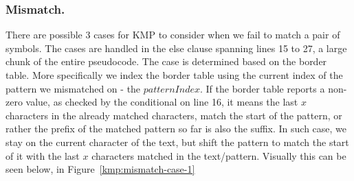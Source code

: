 \subsubsection{Mismatch.}
There are possible 3 cases for KMP to consider when we fail to match a pair of symbols. The cases are handled in the else clause spanning lines 15 to 27, a large chunk of the entire pseudocode. The case is determined based on the border table. More specifically we index the border table using the current index of the pattern we mismatched on - the $patternIndex$. If the border table reports a non-zero value, as checked by the conditional on line 16, it means the last $x$ characters in the already matched characters, match the start of the pattern, or rather the prefix of the matched pattern so far is also the suffix. In such case, we stay on the current character of the text, but shift the pattern to match the start of it with the last $x$ characters matched in the text/pattern. Visually this can be seen below, in Figure~\ref{kmp:mismatch-case-1}


